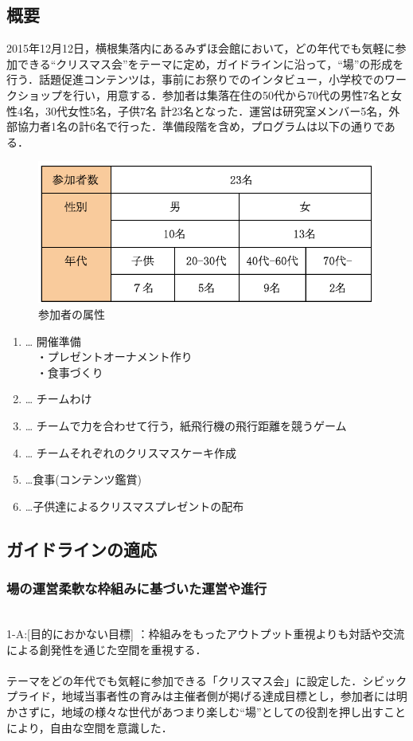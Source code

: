 \documentclass[a4paper]{jsarticle}
\begin{document}
\subsection{概要}
2015年12月12日，横根集落内にあるみずほ会館において，どの年代でも気軽に参加できる“クリスマス会”をテーマに定め，ガイドラインに沿って，“場”の形成を行う．話題促進コンテンツは，事前にお祭りでのインタビュー，小学校でのワークショップを行い，用意する．参加者は集落在住の50代から70代の男性7名と女性4名，30代女性5名，子供7名 計23名となった．運営は研究室メンバー5名，外部協力者1名の計6名で行った．準備段階を含め，プログラムは以下の通りである．\\
\begin{figure}[H]
  \begin{center}
    \includegraphics[width=0.7\hsize]{./images/20.png}
    \caption{参加者の属性}
    \label{fig:tmu_hino}
  \end{center}
\end{figure}

\begin{enumerate}
\item  … 開催準備\\
　・プレゼントオーナメント作り\\
　・食事づくり
\item  … チームわけ
\item … チームで力を合わせて行う，紙飛行機の飛行距離を競うゲーム
\item  … チームそれぞれのクリスマスケーキ作成
\item …食事(コンテンツ鑑賞)
\item …子供達によるクリスマスプレゼントの配布\\
\end{enumerate}


\subsection{ガイドラインの適応}
\subsubsection{場の運営柔軟な枠組みに基づいた運営や進行}\\
1-A:[目的におかない目標] ：枠組みをもったアウトプット重視よりも対話や交流による創発性を通じた空間を重視する．\\\\
テーマをどの年代でも気軽に参加できる「クリスマス会」に設定した．シビックプライド，地域当事者性の育みは主催者側が掲げる達成目標とし，参加者には明かさずに，地域の様々な世代があつまり楽しむ“場”としての役割を押し出すことにより，自由な空間を意識した．\\\\
\end{document}
